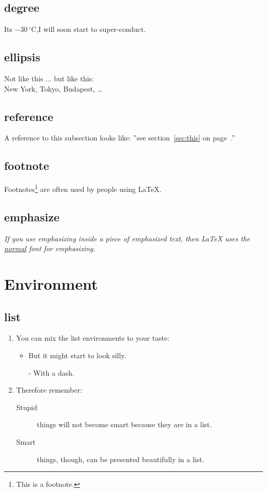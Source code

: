 \documentclass[10pt,a4paper]{article}
\begin{document}
\subsection{degree}
Its $-30\,^{\circ}\mathrm{C}$,I will soon start to super-conduct.


\subsection{ellipsis}
Not like this ... but like this:\\
New York, Tokyo, Budapest, \ldots


\subsection{reference}
A reference to this subsection
\label{sec:this} looks like:
''see section~\ref{sec:this} on
page~\pageref{sec:this}.''


\subsection{footnote}
Footnotes\footnote{This is
a footnote.} are often used
by people using \LaTeX.


\subsection{emphasize}
\emph{If you use
emphasizing inside a piece
of emphasized text, then
\LaTeX{} uses the
\underline{normal} font for
emphasizing.}



\section{Environment}
\subsection{list}
\begin{enumerate}
\item You can mix the list
environments to your taste:
\begin{itemize}
\item But it might start to
look silly.
\item[-] With a dash.
\end{itemize}
\item Therefore remember:
\begin{description}
\item[Stupid] things will not
become smart because they are
in a list.
\item[Smart] things, though, can be
presented beautifully in a list.
\end{description}
\end{enumerate}
\end{document}
